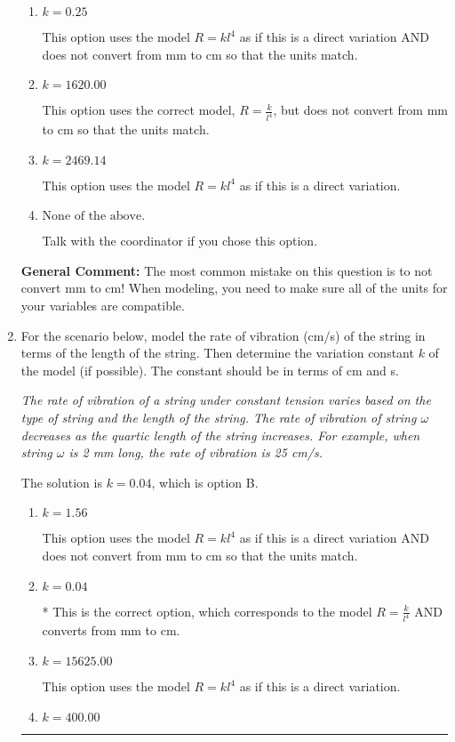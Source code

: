 \documentclass{extbook}[14pt]
\newcommand{\litem}[1]{\item #1

\rule{\textwidth}{0.4pt}}
\begin{document}
\begin{enumerate}
{\begin{enumerate}[label=\Alph*.]
* This is the correct option, which corresponds to the model $R = \frac{k}{l^{4}}$ AND converts from mm to cm.
\item \( k = 0.25 \)

This option uses the model $R = kl^{4}$ as if this is a direct variation AND does not convert from mm to cm so that the units match.
\item \( k = 1620.00 \)

This option uses the correct model, $R = \frac{k}{l^{4}}$, but does not convert from mm to cm so that the units match.
\item \( k = 2469.14 \)

This option uses the model $R = kl^{4}$ as if this is a direct variation.
\item \( \text{None of the above.} \)

Talk with the coordinator if you chose this option.
\end{enumerate}

\textbf{General Comment:} The most common mistake on this question is to not convert mm to cm! When modeling, you need to make sure all of the units for your variables are compatible.
}
\litem{
For the scenario below, model the rate of vibration (cm/s) of the string in terms of the length of the string. Then determine the variation constant $k$ of the model (if possible). The constant should be in terms of cm and s.

\begin{center}
    \textit{ The rate of vibration of a string under constant tension varies based on the type of string and the length of the string. The rate of vibration of string $\omega$ decreases as the quartic length of the string increases. For example, when string $\omega$ is 2 mm long, the rate of vibration is 25 cm/s. }
\end{center}
The solution is \( k = 0.04 \), which is option B.\begin{enumerate}[label=\Alph*.]
\item \( k = 1.56 \)

This option uses the model $R = kl^{4}$ as if this is a direct variation AND does not convert from mm to cm so that the units match.
\item \( k = 0.04 \)

* This is the correct option, which corresponds to the model $R = \frac{k}{l^{4}}$ AND converts from mm to cm.
\item \( k = 15625.00 \)

This option uses the model $R = kl^{4}$ as if this is a direct variation.
\item \( k = 400.00 \)


\end{enumerate}}
\end{enumerate}
\end{document}
